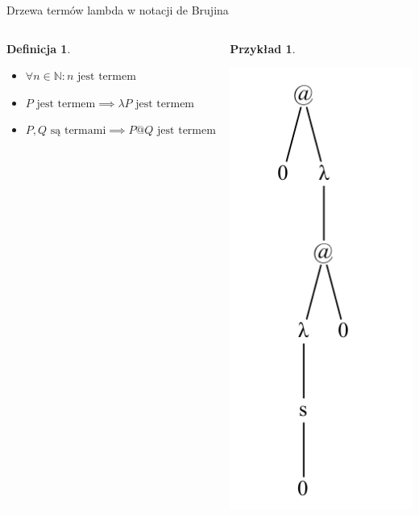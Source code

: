 \documentclass[final]{beamer}
\theoremstyle{bluetheorem}
\theoremstyle{bluetheorem}
\newtheorem{mydefinition}[mytheorem]{Definicja}
\theoremstyle{greentheorem}
\newtheorem{myexample}[mytheorem]{Przykład}
\begin{document}
\begin{frame}{Drzewa termów lambda w notacji de Brujina}
    \begin{columns}
        \begin{mydefinition}
            \begin{itemize}
                \item \(\forall n \in \mathbb{N}: n \text{ jest termem}\)
                \item \(P \text{ jest termem} \implies \lambda P \text{ jest termem}\)
                \item \(P, Q \text{ są termami} \implies P @ Q \text{ jest termem}\)
            \end{itemize}
        \end{mydefinition}

        \begin{myexample}
            \begin{center}
                \includegraphics{lambda_001.png}
            \end{center}
        \end{myexample}
    \end{columns}
\end{frame}
\end{document}
